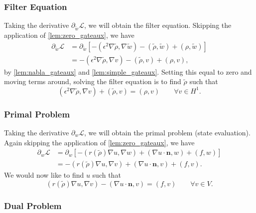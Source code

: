 \subsubsection{Filter Equation}

Taking the derivative $\partial_{\tilde{w}} \mathcal{L}$, we will obtain the filter equation. Skipping the
application of \autoref{lem:zero_gateaux}, we have
\begin{align*}
    \partial_{\tilde{w}} \mathcal{L} &= \partial_{\tilde{w}} \left[ -(\epsilon^2 \nabla \tilde{\rho}, \nabla \tilde{w}) - (\tilde{\rho}, \tilde{w}) + (\rho, \tilde{w})\right] \\
        &= -(\epsilon^2 \nabla \tilde{\rho}, \nabla v) - (\tilde{\rho}, v) + (\rho, v),
\end{align*}
by \autoref{lem:nabla_gateaux} and \autoref{lem:simple_gateaux}.
Setting this equal to zero and moving terms around, solving the filter equation is to find $\tilde{\rho}$ such that
\begin{equation*}
    (\epsilon^2 \nabla \tilde{\rho}, \nabla v) + (\tilde{\rho}, v) = (\rho, v) \qquad \forall v \in H^1.
\end{equation*}

\subsubsection{Primal Problem}

Taking the derivative $\partial_{w} \mathcal{L}$, we will obtain the primal problem (state evaluation). Again skipping the application
of \autoref{lem:zero_gateaux}, we have
\begin{align*}
    \partial_{w} \mathcal{L} &= \partial_{w} \left[ -(r(\tilde{\rho}) \nabla u, \nabla w) + (\nabla u \cdot \mathbf{n}, w) + (f, w) \right]\\
        &= -(r(\tilde{\rho}) \nabla u, \nabla v) + (\nabla u \cdot \mathbf{n}, v) + (f,v).
\end{align*}
We would now like to find $u$ such that
\begin{equation*}
    (r(\tilde{\rho}) \nabla u, \nabla v) - (\nabla u \cdot \mathbf{n}, v) = (f,v) \qquad \forall v \in V.
\end{equation*}

\subsubsection{Dual Problem}

